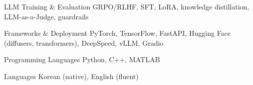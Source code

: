 

\begin{cvskills}

  \cvskill
    {LLM Training \& Evaluation}
    {GRPO/RLHF, SFT, LoRA, knowledge distillation, LLM-as-a-Judge, guardrails}

  \cvskill
    {Frameworks \& Deployment} %
    {PyTorch, TensorFlow, FastAPI, Hugging Face (diffusers, transformers), DeepSpeed, vLLM, Gradio} %

  \cvskill
    {Programming Languages} %
    {Python, C++, MATLAB} %

  \cvskill
    {Languages} %
    {Korean (native), English (fluent)} %


\end{cvskills}
